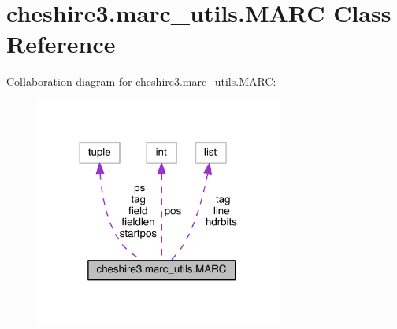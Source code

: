 \hypertarget{classcheshire3_1_1marc__utils_1_1_m_a_r_c}{\section{cheshire3.\-marc\-\_\-utils.\-M\-A\-R\-C Class Reference}
\label{classcheshire3_1_1marc__utils_1_1_m_a_r_c}
}


Collaboration diagram for cheshire3.\-marc\-\_\-utils.\-M\-A\-R\-C\-:
\nopagebreak
\begin{figure}[H]
\begin{center}
\leavevmode
\includegraphics[width=231pt]{classcheshire3_1_1marc__utils_1_1_m_a_r_c__coll__graph}
\end{center}
\end{figure}
